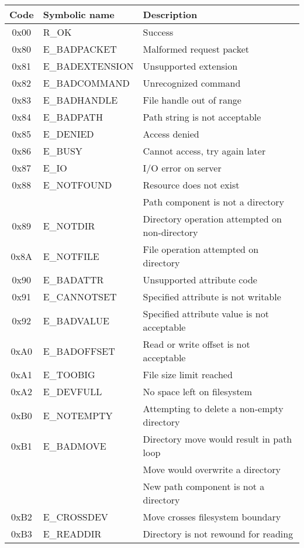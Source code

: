 \begin{table}[h]
\begin{center}

\def\tline#1#2{ {\ttfamily #1} & {\ttfamily #2} }
\begin{tabular}{|cll|}
	\hline
	Code & Symbolic name & Description \\
	\hline
	\tline{0x00}{R\_OK} & Success \\
	\hline

	\tline{0x80}{E\_BADPACKET} & Malformed request packet \\
	\tline{0x81}{E\_BADEXTENSION} & Unsupported extension \\
	\tline{0x82}{E\_BADCOMMAND} & Unrecognized command \\
	\tline{0x83}{E\_BADHANDLE} & File handle out of range \\
	\tline{0x84}{E\_BADPATH} & Path string is not acceptable \\
	\tline{0x85}{E\_DENIED} & Access denied \\
	\tline{0x86}{E\_BUSY} & Cannot access, try again later \\
	\tline{0x87}{E\_IO} & I/O error on server \\
	\tline{0x88}{E\_NOTFOUND} & Resource does not exist \\
		~ & ~ & Path component is not a directory \\
	\tline{0x89}{E\_NOTDIR} & Directory operation attempted on non-directory \\
	\tline{0x8A}{E\_NOTFILE} & File operation attempted on directory \\
	
	\hline

	\tline{0x90}{E\_BADATTR} & Unsupported attribute code \\
	\tline{0x91}{E\_CANNOTSET} & Specified attribute is not writable \\
	\tline{0x92}{E\_BADVALUE} & Specified attribute value is not acceptable \\

	\hline

	\tline{0xA0}{E\_BADOFFSET} & Read or write offset is not acceptable \\
	\tline{0xA1}{E\_TOOBIG} & File size limit reached \\
	\tline{0xA2}{E\_DEVFULL} & No space left on filesystem \\

	\hline

	\tline{0xB0}{E\_NOTEMPTY} & Attempting to delete a non-empty directory \\
	\tline{0xB1}{E\_BADMOVE} & Directory move would result in path loop \\
		~ & ~ & Move would overwrite a directory \\
		~ & ~ & New path component is not a directory \\
	\tline{0xB2}{E\_CROSSDEV} & Move crosses filesystem boundary \\
	\tline{0xB3}{E\_READDIR} & Directory is not rewound for reading \\


\end{tabular}
\end{center}
\end{table}
